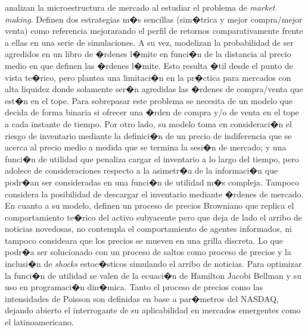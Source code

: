 \documentclass[12pt,a4paper,spanish]{article}%
\begin{document}
\cite{Avellaneda2008} analizan la microestructura de mercado al estudiar el problema de \textit{market making}. 
Definen dos estrategias m�s sencillas (sim�trica y mejor compra/mejor venta) como referencia mejorarando el perfil de retornos comparativamente frente a ellas en una serie de simulaciones.
A su vez, modelizan la probabilidad de ser agredidos en un libro de �rdenes l�mite en funci�n de la distancia al precio medio en que definen las �rdenes l�mite. Esto resulta �til desde el punto de vista te�rico, pero plantea una limitaci�n en la pr�ctica para mercados con alta liquidez donde solamente ser�n agredidas las �rdenes de compra/venta que est�n en el tope. Para sobrepasar este problema se necesita de un modelo que decida de forma binaria si ofrecer una �rden de compra y/o de venta en el tope a cada instante de tiempo.
Por otro lado, su modelo toma en consideraci�n el riesgo de inventario mediante la definici�n de un precio de indiferencia que se acerca al precio medio a medida que se termina la sesi�n de mercado; y una funci�n de utilidad que penaliza cargar el inventario a lo largo del tiempo, pero adolece de consideraciones respecto a la asimetr�a de la informaci�n que podr�an ser consideradas en una funci�n de utilidad m�s compleja. Tampoco considera la posibilidad de descargar el inventario mediante �rdenes de mercado.
En cuanto a su modelo, definen un proceso de precios Browniano que replica el comportamiento te�rico del activo subyacente pero que deja de lado el arribo de noticias novedosas, no contempla el comportamiento de agentes informados, ni tampoco consideara que los precios se mueven en una grilla discreta. Lo que podr�a ser solucionado con un proceso de saltos como proceso de precios y la inclusi�n de \textit{shocks} estoc�sticos simulando el arribo de noticias.
Para optimizar la funci�n de utilidad se valen de la ecuaci�n de Hamilton Jacobi Bellman y su uso en programaci�n din�mica.
Tanto el proceso de precios como las intensidades de Poisson son definidas en base a par�metros del NASDAQ, dejando abierto el interrogante de su aplicabilidad en mercados emergentes como el latinoamericano.
\end{document}
